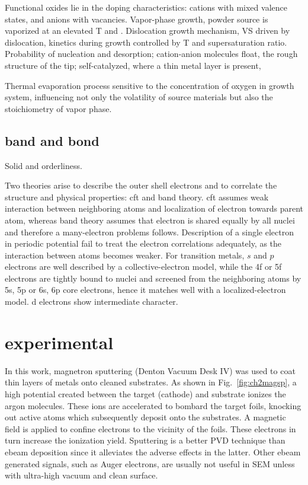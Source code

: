 Functional oxides lie in the doping characteristics: cations with mixed valence states, and anions with vacancies. Vapor-phase growth, powder source is vaporized at an elevated T and .\cite{Dai2003} Dislocation growth mechanism, VS driven by dislocation, kinetics during growth controlled by T and supersaturation ratio. Probability of nucleation and desorption; cation-anion molecules float, the rough structure of the tip; self-catalyzed, where a thin metal layer is present, \cite{Sears1955,Blakely1962}

Thermal evaporation process sensitive to the concentration of oxygen in growth system, influencing not only the volatility of source materials but also the stoichiometry of vapor phase.\cite{Dai2002} 



\section{band and bond}

Solid and orderliness.

Two theories arise to describe the outer shell electrons and to correlate the structure and physical properties: \gls{cft} and band theory.\cite{Goodenough1971} \gls{cft} assumes weak interaction between neighboring atoms and localization of electron towards parent atom, whereas band theory assumes that electron is shared equally by all nuclei and therefore a many-electron problems follows. Description of a single electron in periodic potential fail to treat the electron correlations adequately, as the interaction between atoms becomes weaker. For transition metals, $s$ and $p$ electrons are well described by a collective-electron model, while the 4f or 5f electrons are tightly bound to nuclei and screened from the neighboring atoms by 5s, 5p or 6s, 6p core electrons, hence it matches well with a localized-electron model. d electrons show intermediate character.


\chapter{experimental}
In this work, magnetron sputtering (Denton Vacuum Desk IV) was used to coat thin layers of metals onto cleaned substrates. As shown in Fig.~\ref{fig:ch2magsp}, a high potential created between the target (cathode) and substrate ionizes the argon molecules. These ions are accelerated to bombard the target foils, knocking out active atoms which subsequently deposit onto the substrates. A magnetic field is applied to confine electrons to the vicinity of the foils. These electrons in turn increase the ionization yield.
Sputtering is a better PVD technique than \gls{ebeam} deposition since it alleviates the adverse effects in the latter. 
Other \gls{ebeam} generated signals, such as Auger electrons, are usually not useful in SEM unless with ultra-high vacuum and clean surface.

